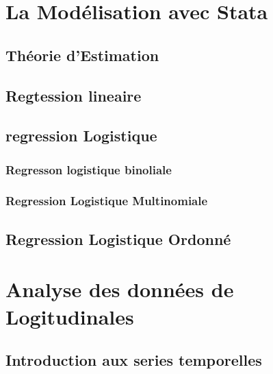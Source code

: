 \documentclass[
]{book}
\begin{document}
\hypertarget{la-moduxe9lisation-avec-stata}{%
\chapter{La Modélisation avec Stata}\label{la-moduxe9lisation-avec-stata}}

\hypertarget{thuxe9orie-destimation}{%
\section{Théorie d'Estimation}\label{thuxe9orie-destimation}}

\hypertarget{regtession-lineaire}{%
\section{Regtession lineaire}\label{regtession-lineaire}}

\hypertarget{regression-logistique}{%
\section{regression Logistique}\label{regression-logistique}}

\hypertarget{regresson-logistique-binoliale}{%
\subsection{Regresson logistique binoliale}\label{regresson-logistique-binoliale}}

\hypertarget{regression-logistique-multinomiale}{%
\subsection{Regression Logistique Multinomiale}\label{regression-logistique-multinomiale}}

\hypertarget{regression-logistique-ordonnuxe9}{%
\section{Regression Logistique Ordonné}\label{regression-logistique-ordonnuxe9}}

\hypertarget{analyse-des-donnuxe9es-de-logitudinales}{%
\chapter{Analyse des données de Logitudinales}\label{analyse-des-donnuxe9es-de-logitudinales}}

\hypertarget{introduction-aux-series-temporelles}{%
\section{Introduction aux series temporelles}\label{introduction-aux-series-temporelles}}
\end{document}
